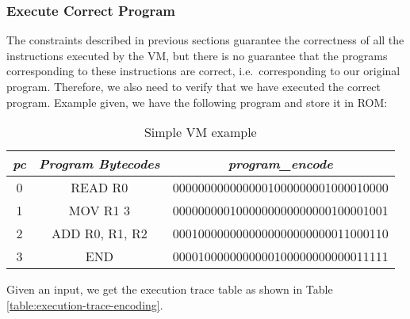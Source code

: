 \subsubsection{Execute Correct Program}

The constraints described in previous sections guarantee the correctness of all the instructions executed by the VM, but there is no guarantee that the programs corresponding to these instructions are correct, i.e.\ corresponding to our original program. Therefore, we also need to verify that we have executed the correct program. Example given, we have the following program and store it in ROM:

\begin{table}[!ht]
    \centering
    \begin{tabular}{|c|c|c|}
    \hline
        \emph{pc} & \emph{Program Bytecodes} & \emph{program\_encode} \\ \hline
        0 & READ R0 & 0000000000000001000000001000010000 \\
        1 & MOV R1 3 & 0000000001000000000000000100001001 \\
        2 & ADD R0, R1, R2 & 0001000000000000000000000011000110 \\
        3 & END & 0000100000000000100000000000011111 \\ \hline
    \end{tabular}
    \caption{Simple VM example}
    \label{table:simple-vm-example}
\end{table}

Given an input, we get the execution trace table as shown in Table \ref{table:execution-trace-encoding}.

\begin{table}[!ht]
    \caption{Execution trace table example}
    \label{table:execution-trace-encoding}
\end{table}

